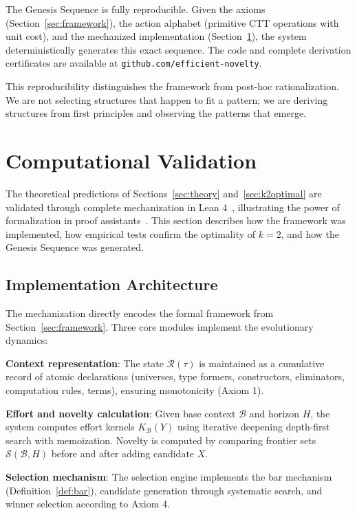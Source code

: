 \documentclass[11pt]{article}
\theoremstyle{definition}
\theoremstyle{plain}
\theoremstyle{remark}
\begin{document}
The Genesis Sequence is fully reproducible. Given the axioms (Section~\ref{sec:framework}), the action alphabet (primitive CTT operations with unit cost), and the mechanized implementation (Section~\ref{sec:lean}), the system deterministically generates this exact sequence. The code and complete derivation certificates are available at \texttt{github.com/efficient-novelty}.

This reproducibility distinguishes the framework from post-hoc rationalization. We are not selecting structures that happen to fit a pattern; we are deriving structures from first principles and observing the patterns that emerge.

\section{Computational Validation}
\label{sec:lean}

The theoretical predictions of Sections~\ref{sec:theory} and~\ref{sec:k2optimal} are validated through complete mechanization in Lean 4~\cite{lean4}, illustrating the power of formalization in proof assistants~\cite{voevodsky}. This section describes how the framework was implemented, how empirical tests confirm the optimality of $k=2$, and how the Genesis Sequence was generated.

\subsection{Implementation Architecture}

The mechanization directly encodes the formal framework from Section~\ref{sec:framework}. Three core modules implement the evolutionary dynamics:

\textbf{Context representation}: The state $\mathcal{R}(\tau)$ is maintained as a cumulative record of atomic declarations (universes, type formers, constructors, eliminators, computation rules, terms), ensuring monotonicity (Axiom 1).

\textbf{Effort and novelty calculation}: Given base context $\mathcal{B}$ and horizon $H$, the system computes effort kernels $K_{\mathcal{B}}(Y)$ using iterative deepening depth-first search with memoization. Novelty is computed by comparing frontier sets $\mathcal{S}(\mathcal{B}, H)$ before and after adding candidate $X$.

\textbf{Selection mechanism}: The selection engine implements the bar mechanism (Definition~\ref{def:bar}), candidate generation through systematic search, and winner selection according to Axiom 4.
\end{document}
